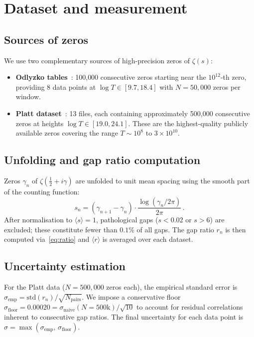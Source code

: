 \documentclass[11pt]{article}
\theoremstyle{plain}
\theoremstyle{remark}
\begin{document}
\section{Dataset and measurement}
\label{sec:data}

\subsection{Sources of zeros}

We use two complementary sources of high-precision zeros of $\zeta(s)$:

\begin{itemize}
\item \textbf{Odlyzko tables}~\cite{odlyzko1987}: 100{,}000 consecutive zeros
starting near the $10^{12}$-th zero, providing 8 data points at
$\log T \in [9.7, 18.4]$ with $N = 50{,}000$ zeros per window.

\item \textbf{Platt dataset}~\cite{platt2021}: 13 files, each containing
approximately 500{,}000 consecutive zeros at heights
$\log T \in [19.0, 24.1]$. These are the highest-quality publicly
available zeros covering the range $T \sim 10^8$ to $3 \times 10^{10}$.
\end{itemize}

\subsection{Unfolding and gap ratio computation}

Zeros $\gamma_n$ of $\zeta(\tfrac{1}{2}+i\gamma)$ are unfolded to unit
mean spacing using the smooth part of the counting function:
\begin{equation}
s_n = (\gamma_{n+1} - \gamma_n) \cdot \frac{\log(\gamma_n/2\pi)}{2\pi}\,.
\label{eq:unfold}
\end{equation}
After normalisation to $\langle s\rangle = 1$, pathological gaps
($s < 0.02$ or $s > 6$) are excluded; these constitute fewer than
$0.1\%$ of all gaps. The gap ratio $r_n$ is then computed via~\eqref{eq:ratio}
and $\langle r\rangle$ is averaged over each dataset.

\subsection{Uncertainty estimation}

For the Platt data ($N = 500{,}000$ zeros each), the empirical standard
error is $\sigma_{\mathrm{emp}} = \mathrm{std}(r_n)/\sqrt{N_{\mathrm{pairs}}}$.
We impose a conservative floor
$\sigma_{\mathrm{floor}} = 0.00020 = \sigma_{\mathrm{naive}}(N{=}500\mathrm{k})/\sqrt{10}$
to account for residual correlations inherent to consecutive gap ratios.
The final uncertainty for each data point is
$\sigma = \max(\sigma_{\mathrm{emp}},\, \sigma_{\mathrm{floor}})$.
\end{document}
